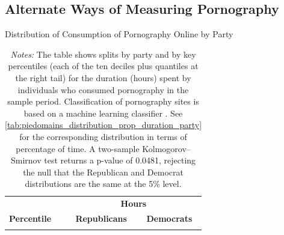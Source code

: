 \documentclass[12pt, letterpaper]{article}
\begin{document}
\subsection{Alternate Ways of Measuring Pornography}
\label{si:alternate_ways}
\begin{table}[ht] \centering \small \setlength\tabcolsep{10 pt}
	\caption{Distribution of Consumption of Pornography Online by Party}
	\label{tab:piedomains_distribution_duration_party}
	\begin{adjustbox}{max width=\textwidth}
		\begin{tabular}{crr}
			\toprule
			\multicolumn{1}{l}{\textbf{}}&\multicolumn{2}{c}{\textbf{Hours}}\\
			\cmidrule(l){2-3}
			\multicolumn{1}{l}{\textbf{Percentile}}&\multicolumn{1}{c}{\textbf{Republicans}}&\multicolumn{1}{c}{\textbf{Democrats}}\\
			\midrule
			\\
			\bottomrule
		\end{tabular}
	\end{adjustbox}
	\caption*{\footnotesize \emph{Notes:} 
		The table shows splits by party and by key percentiles (each of the ten deciles plus quantiles at the right tail) for the duration (hours) spent by individuals who consumed pornography in the sample period. 
		Classification of pornography sites is based on a machine learning classifier \citep{Chintalapati_piedomains_Predict_the_2022}.
		See \cref{tab:piedomains_distribution_prop_duration_party} for the corresponding distribution in terms of percentage of time. 
		A two-sample Kolmogorov–Smirnov test returns a p-value of 0.0481, rejecting the null that the Republican and Democrat distributions are the same at the 5\% level.
	}
\end{table}
\end{document}
